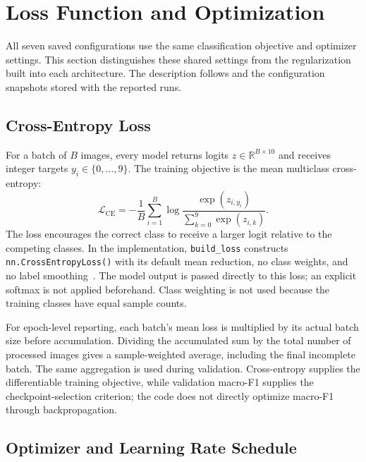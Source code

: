 \section{Loss Function and Optimization}
\label{sec:loss-and-optimization}

All seven saved configurations use the same classification objective and optimizer settings. This section distinguishes these shared settings from the regularization built into each architecture. The description follows  and the configuration snapshots stored with the reported runs.

\subsection{Cross-Entropy Loss}

For a batch of $B$ images, every model returns logits $z\in\mathbb{R}^{B\times10}$ and receives integer targets $y_i\in\{0,\ldots,9\}$. The training objective is the mean multiclass cross-entropy:
\begin{equation}
    \mathcal{L}_{\mathrm{CE}}
    =-\frac{1}{B}\sum_{i=1}^{B}
    \log\frac{\exp(z_{i,y_i})}{\sum_{k=0}^{9}\exp(z_{i,k})}.
    \label{eq:a1-cross-entropy}
\end{equation}
The loss encourages the correct class to receive a larger logit relative to the competing classes. In the implementation, \texttt{build\_loss} constructs \texttt{nn.CrossEntropyLoss()} with its default mean reduction, no class weights, and no label smoothing~\cite{pytorch-cross-entropy}. The model output is passed directly to this loss; an explicit softmax is not applied beforehand. Class weighting is not used because the training classes have equal sample counts.

For epoch-level reporting, each batch's mean loss is multiplied by its actual batch size before accumulation. Dividing the accumulated sum by the total number of processed images gives a sample-weighted average, including the final incomplete batch. The same aggregation is used during validation. Cross-entropy supplies the differentiable training objective, while validation macro-F1 supplies the checkpoint-selection criterion; the code does not directly optimize macro-F1 through backpropagation.

\subsection{Optimizer and Learning Rate Schedule}

